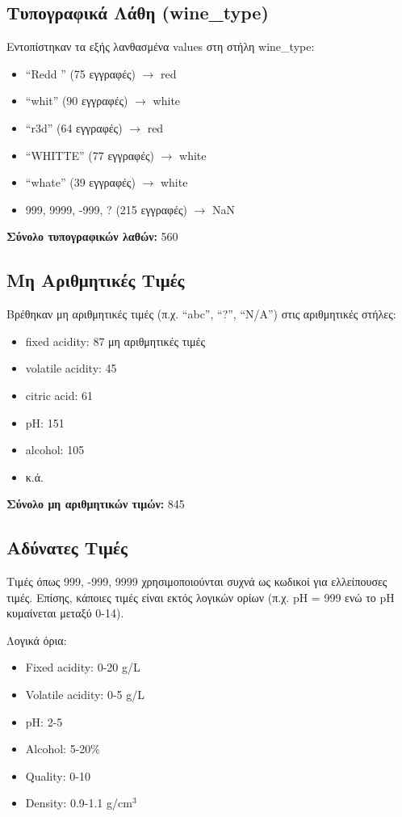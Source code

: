 \documentclass[12pt,a4paper]{article}
\begin{document}
\subsection{Τυπογραφικά Λάθη (wine\_type)}

Εντοπίστηκαν τα εξής λανθασμένα values στη στήλη wine\_type:

\begin{itemize}
    \item ``Redd '' (75 εγγραφές) $\rightarrow$ red
    \item ``whit'' (90 εγγραφές) $\rightarrow$ white
    \item ``r3d'' (64 εγγραφές) $\rightarrow$ red
    \item ``WHITTE'' (77 εγγραφές) $\rightarrow$ white
    \item ``whate'' (39 εγγραφές) $\rightarrow$ white
    \item 999, 9999, -999, ? (215 εγγραφές) $\rightarrow$ NaN
\end{itemize}

\textbf{Σύνολο τυπογραφικών λαθών:} 560

\subsection{Μη Αριθμητικές Τιμές}

Βρέθηκαν μη αριθμητικές τιμές (π.χ. ``abc'', ``?'', ``N/A'') στις αριθμητικές στήλες:

\begin{itemize}
    \item fixed acidity: 87 μη αριθμητικές τιμές
    \item volatile acidity: 45
    \item citric acid: 61
    \item pH: 151
    \item alcohol: 105
    \item κ.ά.
\end{itemize}

\textbf{Σύνολο μη αριθμητικών τιμών:} 845

\subsection{Αδύνατες Τιμές}

Τιμές όπως 999, -999, 9999 χρησιμοποιούνται συχνά ως κωδικοί για ελλείπουσες τιμές. Επίσης, κάποιες τιμές είναι εκτός λογικών ορίων (π.χ. pH = 999 ενώ το pH κυμαίνεται μεταξύ 0-14).

Λογικά όρια:
\begin{itemize}
    \item Fixed acidity: 0-20 g/L
    \item Volatile acidity: 0-5 g/L
    \item pH: 2-5
    \item Alcohol: 5-20\%
    \item Quality: 0-10
    \item Density: 0.9-1.1 g/cm$^3$
\end{itemize}
\end{document}
